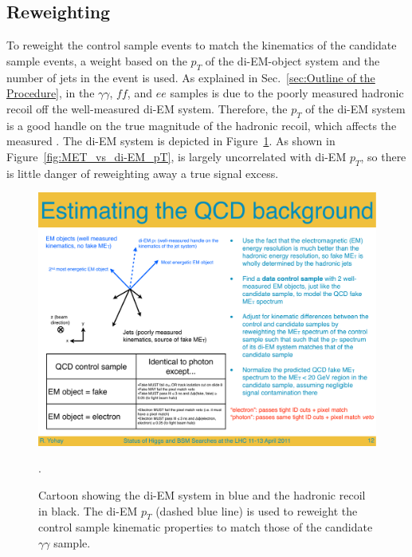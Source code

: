 \documentclass[dissertation_bw.tex]{subfiles}
\begin{document}
\subsection{Reweighting}
\label{sec:Reweighting}

To reweight the control sample events to match the kinematics of the candidate sample events, a weight based on the $p_{T}$ of the di-EM-object system and the number of jets in the event is used.  As explained in Sec.~\ref{sec:Outline of the Procedure}, \MET in the $\gamma\gamma$, $\mathit{ff}$, and $ee$ samples is due to the poorly measured hadronic recoil off the well-measured di-EM system.  Therefore, the $p_{T}$ of the di-EM system is a good handle on the true magnitude of the hadronic recoil, which affects the measured \MET.  The di-EM system is depicted in Figure~\ref{fig:di-EM_pT_cartoon}.  As shown in Figure~\ref{fig:MET_vs_di-EM_pT}, \MET is largely uncorrelated with di-EM $p_{T}$, so there is little danger of reweighting away a true signal excess.

\begin{figure}
	\centering
	\includegraphics[scale=0.5]{di-EM_pT_cartoon}
	\caption{Cartoon showing the di-EM system in blue and the hadronic recoil in black.  The di-EM $p_{T}$ (dashed blue line) is used to reweight the control sample kinematic properties to match those of the candidate $\gamma\gamma$ sample.}.
	\label{fig:di-EM_pT_cartoon}
\end{figure}
\end{document}
